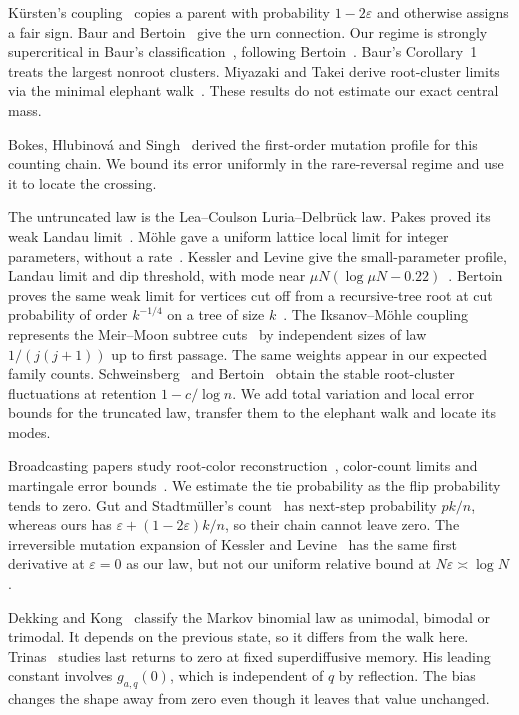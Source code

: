 K\"ursten's coupling~\cite{kursten2016} copies a parent with probability $1-2\varepsilon$ and otherwise assigns
a fair sign. Baur and Bertoin~\cite{baurbertoin2016} give the urn connection. Our regime is
strongly supercritical in Baur's classification~\cite{baur2016}, following
Bertoin~\cite{bertoin2014}. Baur's Corollary~1 treats the largest nonroot
clusters. Miyazaki and Takei derive root-cluster limits via
the minimal elephant walk~\cite[Theorems~2.3, 2.4 and Section~2.3]{miyazakitakei2020}.
These results do not estimate our exact central mass.

Bokes, Hlubinov\'a and Singh~\cite{bhs2023} derived the first-order
mutation profile for this counting chain. We bound its
error uniformly in the rare-reversal regime and use it to locate the
crossing.

The untruncated law is the Lea--Coulson Luria--Delbr\"uck law. Pakes proved
its weak Landau limit~\cite[p.~993]{pakes1993}. M\"ohle gave a uniform
lattice local limit for integer parameters, without a
rate~\cite[Corollaries~4.1--4.2]{mohle2005}. Kessler and
Levine give the small-parameter profile, Landau limit and dip threshold,
with mode near $\mu N(\log\mu N-0.22)$~\cite[Section~2 and Eqs.~(14),
(18), (19)]{kesslerlevine2015}. Bertoin proves the same weak limit for
vertices cut off from a recursive-tree root at cut probability of order
$k^{-1/4}$ on a tree of size $k$~\cite[Proposition~1]{bertoin2014ejp}.
The Iksanov--M\"ohle coupling~\cite[Proposition~1]{iksanovmohle2007}
represents the Meir--Moon subtree cuts~\cite{meirmoon1974} by independent
sizes of law $1/(j(j+1))$ up to first passage. The same weights appear
in our expected family counts.
Schweinsberg~\cite{schweinsberg2012} and Bertoin~\cite{bertoin2014ejp}
obtain the stable root-cluster fluctuations at retention $1-c/\log n$.
We add total variation and local error bounds for the truncated law,
transfer them to the elephant walk and locate its modes.

Broadcasting papers study root-color reconstruction~\cite{adlv2022,ahs2026},
color-count limits and martingale error bounds~\cite{dhw2023,ksw2026}.
We estimate the tie probability as the flip probability tends to zero.
Gut and Stadtm\"uller's count~\cite[(1.5)]{gs2026} has next-step
probability $pk/n$, whereas ours has
$\varepsilon+(1-2\varepsilon)k/n$, so their chain cannot leave zero.
The irreversible mutation expansion of Kessler and
Levine~\cite[Eqs.~(10), (13), (14)]{kesslerlevine2013} has the same
first derivative at $\varepsilon=0$ as our law, but not our uniform
relative bound at $N\varepsilon\asymp\log N$.


Dekking and Kong~\cite[Theorem~4.1]{dekkingkong2011} classify the Markov
binomial law as unimodal, bimodal or trimodal. It depends on the previous
state, so it differs from the walk here.
Trinas~\cite{trinas2026return} studies last returns to zero at fixed
superdiffusive memory. His leading constant involves $g_{a,q}(0)$, which
is independent of $q$ by reflection. The bias changes the shape away
from zero even though it leaves that value unchanged.
